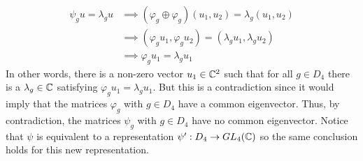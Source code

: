 \begin{solution}
\begin{enumerate}
        \begin{align*}
            \psi_g u = \lambda_g u &\implies (\varphi_g \oplus\varphi_g)(u_1, u_2) = \lambda_g(u_1, u_2)\\
            &\implies (\varphi_g u_1, \varphi_g u_2) = (\lambda_g u_1, \lambda_g u_2) \\
            &\implies \varphi_g u_1 = \lambda_g u_1
        \end{align*}
        In other words, there is a non-zero vector $u_1 \in \mathbb{C}^2$ such that for all $g \in D_4$ there is a $\lambda_g \in \mathbb{C}$ satisfying $\varphi_g u_1 = \lambda_g u_1$. But this is a contradiction since it would imply that the matrices $\varphi_g$ with $g \in D_4$ have a common eigenvector. Thus, by contradiction, the matrices $\psi_g$ with $g \in D_4$ have no common eigenvector. Notice that $\psi$ is equivalent to a representation $\psi' : D_4 \to GL_4(\mathbb{C})$ so the same conclusion holds for this new representation.
    \end{enumerate}
\end{solution}